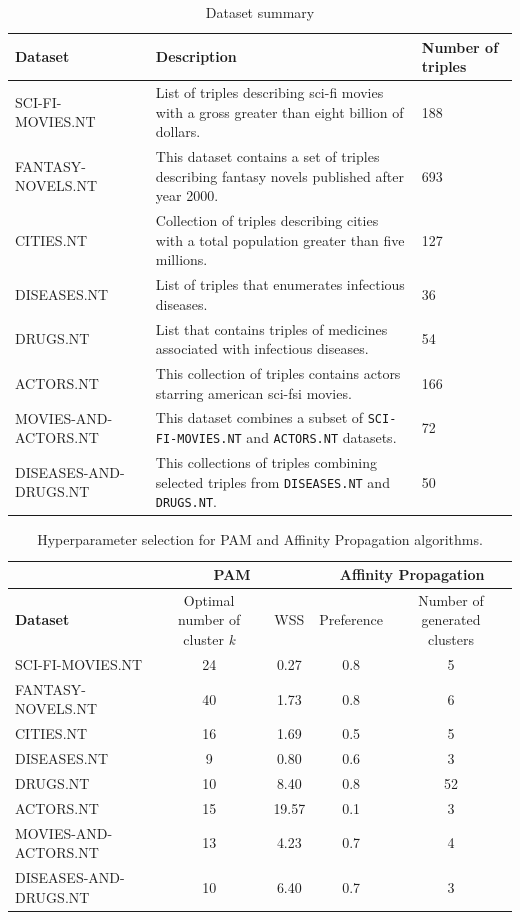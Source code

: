 \documentclass{ieeeaccess}
\begin{document}
\begin{table}[!htb]
\caption{Dataset summary}
\label{tab:datasets_sizes}
\centering
\begin{tabular}{l L{10cm} l}
     \toprule
     \textbf{Dataset} & 
     \textbf{Description} &
     \textbf{Number of triples} 
     \\
     \midrule
     SCI-FI-MOVIES.NT & List of triples describing sci-fi movies
     with a gross greater than eight billion of dollars. & 188 \\
     FANTASY-NOVELS.NT &  This dataset contains a set of triples 
     describing fantasy novels published after year 2000. & 693 \\
     CITIES.NT & Collection of triples describing cities with a 
     total population greater than five millions.  & 127 \\
     DISEASES.NT & List of triples that enumerates infectious 
     diseases. & 36 \\
     DRUGS.NT & List that contains triples of medicines associated 
     with infectious diseases. & 54 \\
     ACTORS.NT & This collection of triples contains actors 
     starring american sci-fsi movies.  & 166 \\
     MOVIES-AND-ACTORS.NT & This dataset combines a subset of 
     \texttt{SCI-FI-MOVIES.NT} and \texttt{ACTORS.NT} datasets. &
     72 \\
     DISEASES-AND-DRUGS.NT & This collections of triples combining 
     selected triples from \texttt{DISEASES.NT} and 
     \texttt{DRUGS.NT}. & 50  \\
     \bottomrule
\end{tabular}
\end{table}
\begin{table}[!h]
\caption{Hyperparameter selection for PAM and Affinity Propagation
algorithms.}
\label{tab:elbow_numbers}
\centering
\begin{tabular}{lcccc}
     \toprule
     & \multicolumn{2}{c}{PAM} 
     & \multicolumn{2}{c}{Affinity Propagation} \\
     \hline
     \textbf{Dataset} & 
     \footnotesize Optimal number of cluster \textit{k} &
     \footnotesize WSS &
     \footnotesize Preference &
     \footnotesize Number of generated clusters \\
     \midrule
     SCI-FI-MOVIES.NT & 24 & 0.27 & 0.8 & 5 \\
     FANTASY-NOVELS.NT & 40 & 1.73 & 0.8 & 6 \\
     CITIES.NT & 16 & 1.69 & 0.5 &  5 \\
     DISEASES.NT & 9 & 0.80 & 0.6 & 3 \\
     DRUGS.NT & 10 & 8.40 & 0.8 & 52 \\
     ACTORS.NT & 15 & 19.57 & 0.1 & 3 \\
     MOVIES-AND-ACTORS.NT & 13 & 4.23 & 0.7 & 4 \\
     DISEASES-AND-DRUGS.NT & 10 & 6.40 & 0.7 & 3 \\ 
     \bottomrule
\end{tabular}
\end{table}
\end{document}
